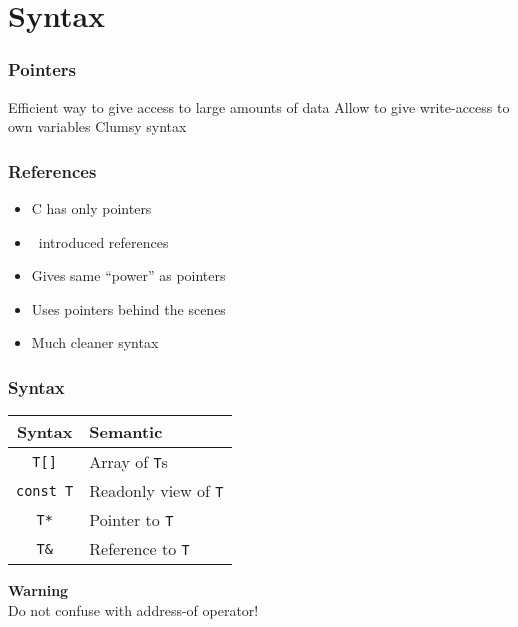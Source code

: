 \section{Syntax}

\frame{\tableofcontents[currentsection]}

\begin{frame}
  \frametitle{Pointers}
  \begin{procontralist}
    \pro Efficient way to give access to large amounts of data
    \pro Allow to give write-access to own variables
    \con Clumsy syntax
  \end{procontralist}
  \vskip5mm
  \begin{overprint}

  \end{overprint}
\end{frame}

\begin{frame}
  \frametitle{References}
  \begin{itemize}
    \item C has only pointers
    \item \cpp\ introduced references
    \item Gives same ``power'' as pointers
    \item Uses pointers behind the scenes
    \item Much cleaner syntax
  \end{itemize}
\end{frame}

\begin{frame}
  \frametitle{Syntax}
  \begin{center}
    \begin{tabular}{cl}
      \textbf{Syntax}       & \textbf{Semantic} \\
      \toprule
      \texttt{T[]}          & Array of \texttt{T}s \\
      \texttt{const T}      & Readonly view of \texttt{T} \\
      \texttt{T*}           & Pointer to \texttt{T} \\
      \alert{\texttt{T\&}}  & \alert{Reference to \texttt{T}} \\
    \end{tabular}
  \end{center}
  \begin{framed}
    \begin{center} \Large
      \textbf{Warning} \\[2mm]
      Do not confuse with address-of operator!
    \end{center}
  \end{framed}
\end{frame}


